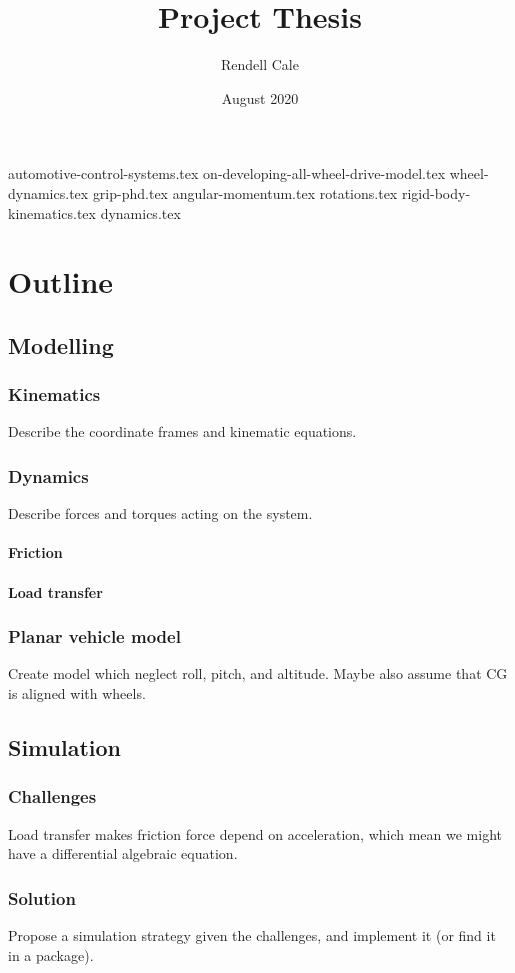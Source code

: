 \documentclass{article}
\title{Project Thesis}
\author{Rendell Cale}
\date{August 2020}
\begin{document}
\maketitle

{automotive-control-systems.tex}
{on-developing-all-wheel-drive-model.tex}
{wheel-dynamics.tex}
{grip-phd.tex}
{angular-momentum.tex}
{rotations.tex}
{rigid-body-kinematics.tex}
{dynamics.tex}


\section{Outline}
\subsection{Modelling}
\subsubsection{Kinematics}
Describe the coordinate frames and kinematic equations.
\subsubsection{Dynamics}
Describe forces and torques acting on the system.
\paragraph{Friction}
\paragraph{Load transfer}
\subsubsection{Planar vehicle model}
Create model which neglect roll, pitch, and altitude. Maybe also assume that CG is aligned with wheels.
\subsection{Simulation}
\subsubsection{Challenges}
Load transfer makes friction force depend on acceleration, which mean we might have a differential algebraic equation.
\subsubsection{Solution}
Propose a simulation strategy given the challenges, and implement it (or find it in a package). 




\printbibliography
\end{document}
